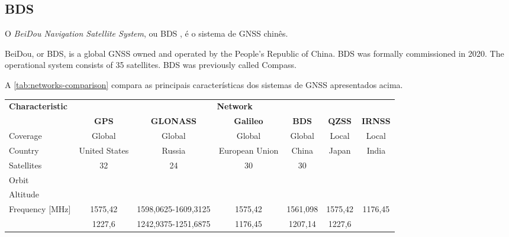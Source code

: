 \subsection{BDS}

O \textit{BeiDou Navigation Satellite System}, ou BDS \cite{beidou}, é o sistema de GNSS chinês.

BeiDou, or BDS, is a global GNSS owned and operated by the People's Republic of China. BDS was formally commissioned in 2020. The operational system consists of 35 satellites. BDS was previously called Compass.



A \autoref{tab:networks-comparison} compara as principais características dos sistemas de GNSS apresentados acima.

\begin{table}[!h]
    \centering
    \begin{tabular}{lcccccc}
        \toprule[1.5pt]
        \multirow{2}{*}{\textbf{Characteristic}} & \multicolumn{6}{c}{\textbf{Network}} \\
                                                 & \textbf{GPS} & \textbf{GLONASS} & \textbf{Galileo} & \textbf{BDS} & \textbf{QZSS} & \textbf{IRNSS} \\
        \midrule
        Coverage                         & Global            & Global                       & Global               & Global         & Local   & Local \\
        Country                          & United States     & Russia                       & European Union       & China          & Japan   & India \\
        Satellites                       & 32                & 24                           & 30                   & 30             &         &  \\
        Orbit                            &                   &                              &                      &                &         &  \\
        Altitude                         &                   &                              &                      &                &         &  \\
        \multirow{6}{*}{Frequency [MHz]} & 1575,42           & 1598,0625-1609,3125          & 1575,42              & 1561,098       & 1575,42 & 1176,45 \\
                                         & 1227,6            & 1242,9375-1251,6875          & 1176,45              & 1207,14        & 1227,6  &  \\

\end{tabular}
\end{table}
